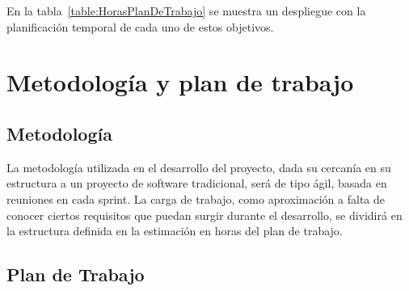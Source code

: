 En la tabla~\ref{table:HorasPlanDeTrabajo} se muestra un despliegue con la planificación temporal de cada uno de estos objetivos.

\section{Metodología y plan de trabajo}
\subsection{Metodología}
La metodología utilizada en el desarrollo del proyecto, dada su cercanía en su estructura a un proyecto de software tradicional, será de tipo ágil, basada en reuniones en cada sprint.
La carga de trabajo, como aproximación a falta de conocer ciertos requisitos que puedan surgir durante el desarrollo, se dividirá en la estructura definida en la estimación en horas del plan de trabajo.

\subsection{Plan de Trabajo}

